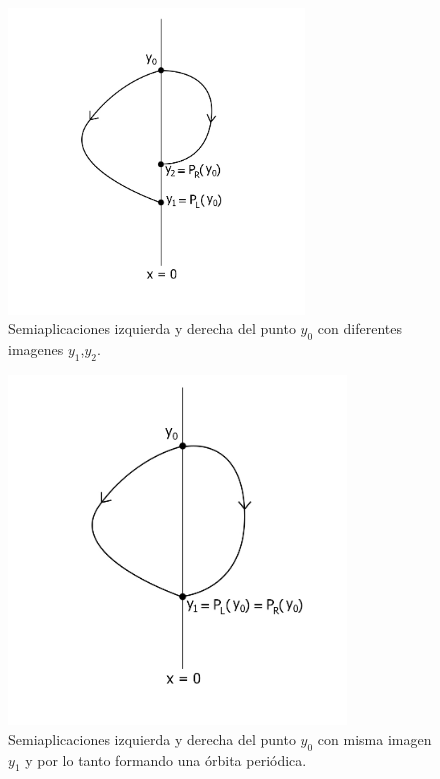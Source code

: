 \documentclass[12pt,a4paper]{report} %
\begin{document}
	 \begin{figure}[h]
		\centering
		\includegraphics[width=0.7\textwidth]{aplipoincareLR.jpg}
		\caption{Semiaplicaciones izquierda y derecha del punto $y_0$ con diferentes imagenes $y_1$,$y_2$.}
		\label{fig:aplipoincareLR}
	\end{figure}\smallskip
	\newpage
	
	 \begin{figure}[h]
		\centering
		\includegraphics[width=0.8\textwidth]{aplipoincareLR - copia.jpg}
		\caption{Semiaplicaciones izquierda y derecha del punto $y_0$ con misma imagen $y_1$ y por lo tanto formando una órbita periódica.}
		\label{fig:aplipoincareLR - copia}
	\end{figure}\smallskip
	    
\end{document}
